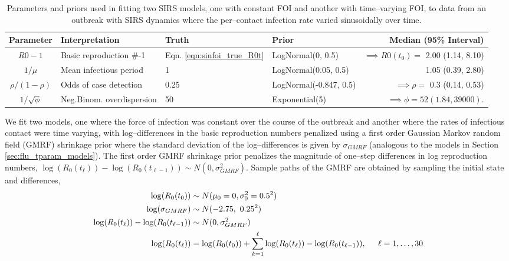 \begin{table}[htbp]
	\caption[Parameters and priors for models fit two SIRS models to data from a simulated outbreak with sinusoidal FOI.]{Parameters and priors used in fitting two SIRS models, one with constant FOI and another with time--varying FOI, to data from an outbreak with SIRS dynamics where the per--contact infection rate varied sinusoidally over time.}
	\label{tab:tparam_sim_priors}
	\scriptsize\centering
	\begin{tabular}{clllr}
		\hline
		\textbf{Parameter} & \textbf{Interpretation} & \textbf{Truth} & \textbf{Prior} & \textbf{Median (95\% Interval)} \\ \hline
		$ R0-1 $ & Basic reproduction \#-1 & Eqn. \ref{eqn:sinfoi_true_R0t} & LogNormal(0, 0.5) & $ \implies R0(t_0) = $ 2.00 (1.14, 8.10) \\ 
		$ 1/\mu $ & Mean infectious period & 1&  LogNormal(0.05, 0.5)& 1.05 (0.39, 2.80) \\
		$ \rho/(1-\rho)  $ & Odds of case detection  &0.25&  LogNormal(-0.847, 0.5) & $ \implies \rho =$ 0.3 (0.14, 0.53) \\
		$ 1/\sqrt{\phi} $ & Neg.Binom. overdispersion & 50 & Exponential(5)& $ \implies \phi = 52 (1.84, 39000) $.  \\
		\hline
	\end{tabular}
\end{table}

We fit two models, one where the force of infection was constant over the course of the outbreak and another where the rates of infectious contact were time varying, with log--differences in the basic reproduction numbers penalized using a first order Gaussian Markov random field (GMRF) shrinkage prior where the standard deviation of the log--differences is given by $ \sigma_{GMRF} $ (analogous to the models in Section \ref{sec:flu_tparam_models}). 
The first order GMRF shrinkage prior penalizes the magnitude of one--step differences in log reproduction numbers, $ \log(R_0(t_\ell)) - \log(R_0(t_{\ell-1}))\sim N(0,\sigma_{GMRF}^2) $. Sample paths of the GMRF are obtained by sampling the initial state and differences,
\begin{align}
\log(R_0(t_0)) &\sim N(\mu_0 = 0, \sigma_{0}^2 = 0.5^2)\\ 
\log(\sigma_{GMRF}) &\sim N(-2.75,\ 0.25^2)\\
\log(R_0(t_\ell)) - \log(R_0(t_{\ell-1})) &\sim N(0, \sigma_{GMRF}^2) \\
\log(R_0(t_\ell)) &= \log(R_0(t_0)) + \sum_{k=1}^{\ell}\log(R_0(t_\ell)) - \log(R_0(t_{\ell-1})),\hspace{0.2in} \ell = 1,\dots,30
\end{align}

